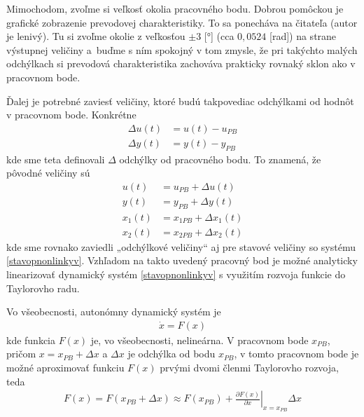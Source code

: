 \documentclass[a4paper, 10pt, ]{article}
\begin{document}
\bigskip

Mimochodom, zvoľme si veľkosť okolia pracovného bodu. Dobrou pomôckou je grafické zobrazenie prevodovej charakteristiky. To sa ponecháva na čitateľa (autor je lenivý). Tu si zvoľme okolie z veľkosťou $\pm 3$ [°] (cca $0,0524$ [rad]) na strane výstupnej veličiny a~buďme s ním spokojný v tom zmysle, že pri takýchto malých odchýlkach si prevodová charakteristika zachováva prakticky rovnaký sklon ako v pracovnom bode.

\bigskip

Ďalej je potrebné zaviesť veličiny, ktoré budú takpovediac odchýlkami od hodnôt v pracovnom bode. Konkrétne
\begin{subequations}
    \begin{align}
        \Delta u(t) &= u(t) - u_{PB} \\
        \Delta y(t) &= y(t) - y_{PB}
    \end{align}
\end{subequations}
kde sme teta definovali $\Delta$ odchýlky od pracovného bodu. To znamená, že pôvodné veličiny sú
\begin{subequations}
    \begin{align}
        u(t)  &=  u_{PB} + \Delta u(t) \\
        y(t)  &=  y_{PB} + \Delta y(t) \\
        x_1(t)  &=  x_{1PB} + \Delta x_1(t) \\
        x_2(t)  &=  x_{2PB} + \Delta x_2(t)
    \end{align}
\end{subequations}
kde sme rovnako zaviedli „odchýlkové veličiny“ aj pre stavové veličiny so systému \eqref{stavopnonlinkyv}. Vzhľadom na takto uvedený pracovný bod je možné analyticky linearizovať dynamický systém \eqref{stavopnonlinkyv} s využitím rozvoja funkcie do Taylorovho radu.

Vo všeobecnosti, autonómny dynamický systém je
\begin{align}
    \dot x = F(x)
\end{align}
kde funkcia $F(x)$ je, vo všeobecnosti, nelineárna. V pracovnom bode $x_{PB}$, pričom $x = x_{PB} + \Delta x$ a $\Delta x$ je odchýlka od bodu $x_{PB}$, v tomto pracovnom bode je možné aproximovať funkciu $F(x)$ prvými dvomi členmi Taylorovho rozvoja, teda
\begin{align}
    F(x) = F(x_{PB} + \Delta x) \approx F(x_{PB}) +   \left. \frac{\partial F(x)}{\partial x} \right|_{x=x_{PB}}\Delta x
\end{align}
\end{document}
